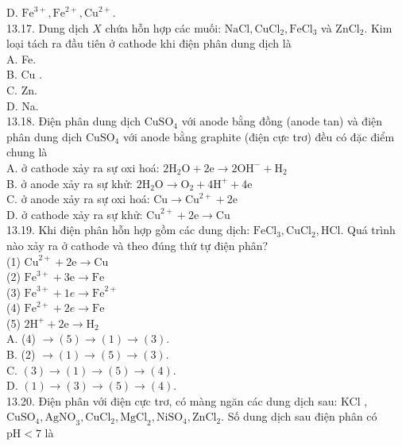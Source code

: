 \documentclass[10pt]{article}
\begin{document}
D. $\mathrm{Fe}^{3+}, \mathrm{Fe}^{2+}, \mathrm{Cu}^{2+}$.\\
13.17. Dung dịch $X$ chứa hỗn hợp các muối: $\mathrm{NaCl}, \mathrm{CuCl}_{2}, \mathrm{FeCl}_{3}$ và $\mathrm{ZnCl}_{2}$. Kim loại tách ra đầu tiên ở cathode khi điện phân dung dịch là\\
A. Fe.\\
B. Cu .\\
C. Zn.\\
D. Na.\\
13.18. Điện phân dung dịch $\mathrm{CuSO}_{4}$ với anode bằng đồng (anode tan) và điện phân dung dịch $\mathrm{CuSO}_{4}$ với anode bằng graphite (điện cực trơ) đều có đặc điểm chung là\\
A. ở cathode xảy ra sự oxi hoá: $2 \mathrm{H}_{2} \mathrm{O}+2 \mathrm{e} \rightarrow 2 \mathrm{OH}^{-}+\mathrm{H}_{2}$\\
B. ở anode xảy ra sự khử: $2 \mathrm{H}_{2} \mathrm{O} \rightarrow \mathrm{O}_{2}+4 \mathrm{H}^{+}+4 \mathrm{e}$\\
C. ở anode xảy ra sự oxi hoá: $\mathrm{Cu} \rightarrow \mathrm{Cu}^{2+}+2 \mathrm{e}$\\
D. ở cathode xảy ra sự khử: $\mathrm{Cu}^{2+}+2 \mathrm{e} \rightarrow \mathrm{Cu}$\\
13.19. Khi điện phân hỗn hợp gồm các dung dịch: $\mathrm{FeCl}_{3}, \mathrm{CuCl}_{2}, \mathrm{HCl}$. Quá trình nào xảy ra ở cathode và theo đúng thứ tự điện phân?\\
(1) $\mathrm{Cu}^{2+}+2 \mathrm{e} \rightarrow \mathrm{Cu}$\\
(2) $\mathrm{Fe}^{3+}+3 \mathrm{e} \rightarrow \mathrm{Fe}$\\
(3) $\mathrm{Fe}^{3+}+1 e \rightarrow \mathrm{Fe}^{2+}$\\
(4) $\mathrm{Fe}^{2+}+2 e \rightarrow \mathrm{Fe}$\\
(5) $2 \mathrm{H}^{+}+2 \mathrm{e} \rightarrow \mathrm{H}_{2}$\\
A. (4) $\rightarrow(5) \rightarrow(1) \rightarrow(3)$.\\
B. (2) $\rightarrow(1) \rightarrow(5) \rightarrow(3)$.\\
C. $(3) \rightarrow(1) \rightarrow(5) \rightarrow(4)$.\\
D. $(1) \rightarrow(3) \rightarrow(5) \rightarrow(4)$.\\
13.20. Điện phân với điện cực trơ, có màng ngăn các dung dịch sau: KCl , $\mathrm{CuSO}_{4}, \mathrm{AgNO}_{3}, \mathrm{CuCl}_{2}, \mathrm{MgCl}_{2}, \mathrm{NiSO}_{4}, \mathrm{ZnCl}_{2}$. Số dung dịch sau điện phân có $\mathrm{pH}<7$ là\\
\end{document}
